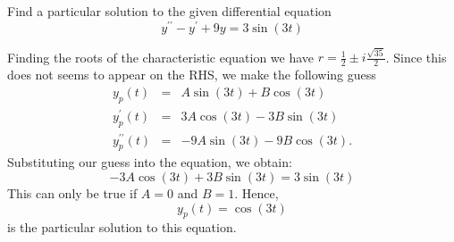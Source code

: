\documentclass[11pt]{article}
\begin{document}
\begin{problem}
Find a particular solution to the given differential equation
\begin{equation*}
y^{\prime \prime} - y^{\prime} +  9y = 3\sin(3t)
\end{equation*} 
\end{problem}
\begin{solution}
Finding the roots of the characteristic equation we have $r=\frac{1}{2}\pm i \frac{\sqrt{35}}{2}$. Since this does not seems to appear on the RHS, we make the following guess
\begin{eqnarray*}
y_{p}(t) & = & A \sin(3t) + B \cos(3t) \\
y_{p}^{\prime}(t) &= &3A \cos(3t) - 3B \sin(3t) \\
y_{p}^{\prime \prime}(t) &= & -9A \sin(3t) - 9B \cos(3t).
\end{eqnarray*}
Substituting our guess into the equation, we obtain:
\begin{equation*}
-3A \cos(3t) + 3B \sin(3t) = 3\sin(3t)
\end{equation*}
This can only be true if $A=0$ and $B=1$. 
Hence, $$\boxed{y_{p}(t) = \cos(3t)}$$ is the particular solution to this equation.
\end{solution}
\end{document}
